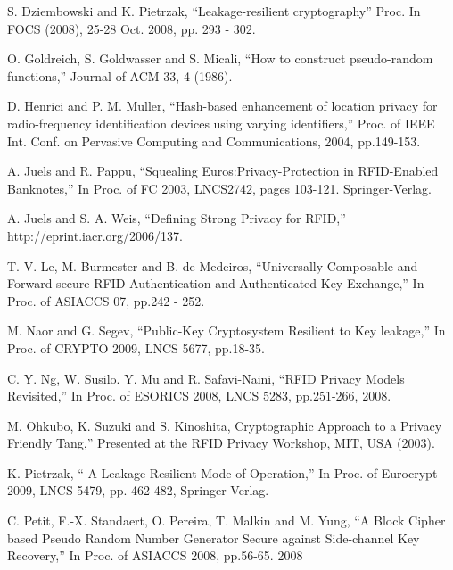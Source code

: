 \documentclass[english]{llncs}
\begin{document}
\begin{thebibliography}{21}
 S. Dziembowski and K. Pietrzak, {}``Leakage-resilient
cryptography'' Proc. In FOCS (2008), 25-28 Oct. 2008, pp. 293 - 302.

 O. Goldreich, S. Goldwasser and S. Micali, {}``How
to construct pseudo-random functions,'' Journal of ACM 33, 4 (1986).

 D. Henrici and P. M. Muller, {}``Hash-based enhancement
of location privacy for radio-frequency identification devices using
varying identifiers,'' Proc. of IEEE Int. Conf. on Pervasive Computing
and Communications, 2004, pp.149-153.

 A. Juels and R. Pappu, {}``Squealing Euros:Privacy-Protection
in RFID-Enabled Banknotes,'' In Proc. of FC 2003, LNCS2742, pages
103-121. Springer-Verlag.

 A. Juels and S. A. Weis, {}``Defining Strong Privacy
for RFID,'' http://eprint.iacr.org/2006/137.

 T. V. Le, M. Burmester and B. de Medeiros, {}``Universally
Composable and Forward-secure RFID Authentication and Authenticated
Key Exchange,'' In Proc. of ASIACCS 07, pp.242 - 252.




 M. Naor and G. Segev, {}``Public-Key Cryptosystem
Resilient to Key leakage,'' In Proc. of CRYPTO 2009, LNCS 5677, pp.18-35.

 C. Y. Ng, W. Susilo. Y. Mu and R. Safavi-Naini,
{}``RFID Privacy Models Revisited,'' In Proc. of ESORICS 2008, LNCS
5283, pp.251-266, 2008.




 M. Ohkubo, K. Suzuki and S. Kinoshita, \textquotedbl{}Cryptographic
Approach to a Privacy Friendly Tang,'' Presented at the RFID Privacy
Workshop, MIT, USA (2003).

 K. Pietrzak, {}`` A Leakage-Resilient Mode of Operation,''
In Proc. of Eurocrypt 2009, LNCS 5479, pp. 462-482, Springer-Verlag.

 C. Petit, F.-X. Standaert, O. Pereira, T. Malkin
and M. Yung, {}``A Block Cipher based Pseudo Random Number Generator
Secure against Side-channel Key Recovery,'' In Proc. of ASIACCS 2008,
pp.56-65. 2008


\end{thebibliography}
\end{document}
